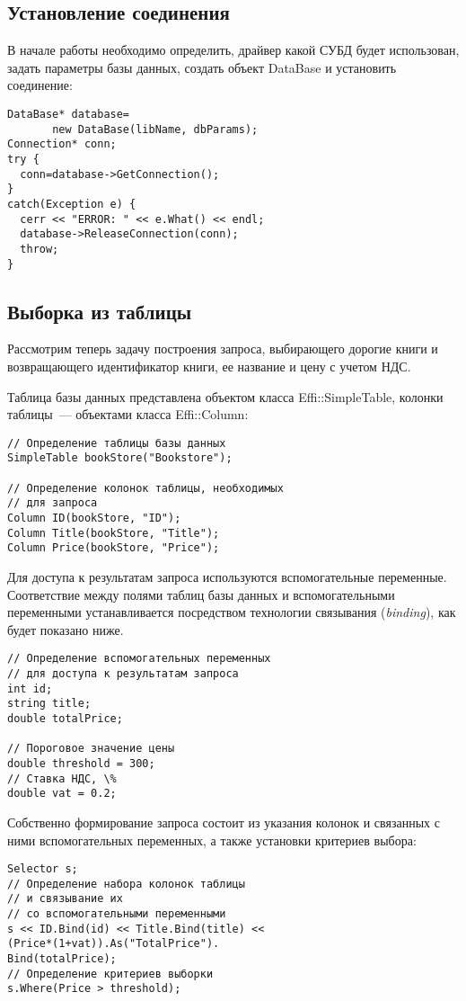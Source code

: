 \begin{multicols}{2}


\subsection{Установление соединения} %

В начале работы необходимо определить, драйвер какой СУБД будет использован, задать 
параметры базы данных, создать объект DataBase и установить соединение: 
\begin{verbatim}
DataBase* database= 
       new DataBase(libName, dbParams);
Connection* conn;
try {
  conn=database->GetConnection();
}
catch(Exception e) {
  cerr << "ERROR: " << e.What() << endl;
  database->ReleaseConnection(conn);
  throw;
}
\end{verbatim}


\subsection{Выборка из таблицы} %

Рассмотрим теперь задачу построения запроса, выбирающего дорогие книги и 
возвращающего идентификатор книги, ее название и цену с учетом НДС.

Таблица базы данных представлена объектом класса {\sf Effi::SimpleTable}, колонки 
таблицы~--- объектами класса {\sf Effi::Column}:
\begin{verbatim}
// Определение таблицы базы данных
SimpleTable bookStore("Bookstore");

// Определение колонок таблицы, необходимых
// для запроса
Column ID(bookStore, "ID");
Column Title(bookStore, "Title");
Column Price(bookStore, "Price");
\end{verbatim}

Для доступа к результатам запроса используются вспомогательные переменные. 
Соответствие между полями таблиц базы данных и вспомогательными переменными 
устанавливается посредством технологии связывания (\textit{binding}), как будет показано 
ниже. 
\begin{verbatim}
// Определение вспомогательных переменных
// для доступа к результатам запроса
int id;
string title;
double totalPrice;

// Пороговое значение цены
double threshold = 300;
// Ставка НДС, \%
double vat = 0.2;
\end{verbatim}

Собственно формирование запроса состоит из указания колонок и связанных с ними 
вспомогательных переменных, а также установки критериев выбора: 
{\small \begin{verbatim}
Selector s;
// Определение набора колонок таблицы
// и связывание их
// со вспомогательными переменными
s << ID.Bind(id) << Title.Bind(title) << 
(Price*(1+vat)).As("TotalPrice"). 
Bind(totalPrice);
// Определение критериев выборки
s.Where(Price > threshold);
\end{verbatim}}


\end{multicols}

